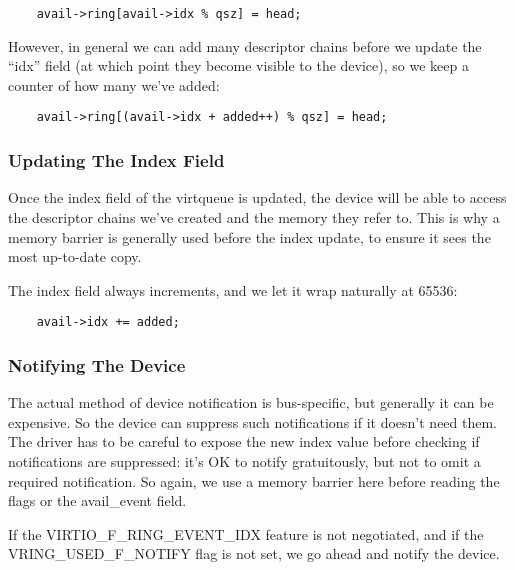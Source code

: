 \begin{lstlisting}
	avail->ring[avail->idx % qsz] = head;
\end{lstlisting}

However, in general we can add many descriptor chains before we update
the “idx” field (at which point they become visible to the
device), so we keep a counter of how many we've added:

\begin{lstlisting}
	avail->ring[(avail->idx + added++) % qsz] = head;
\end{lstlisting}

\subsubsection{Updating The Index Field}\label{sec:General Initialization And Device Operation / Device Operation / Supplying Buffers to The Device / Updating The Index Field}

Once the index field of the virtqueue is updated, the device will
be able to access the descriptor chains we've created and the
memory they refer to. This is why a memory barrier is generally
used before the index update, to ensure it sees the most up-to-date
copy.

The index field always increments, and we let it wrap naturally at
65536:

\begin{lstlisting}
	avail->idx += added;
\end{lstlisting}

\subsubsection{Notifying The Device}\label{sec:General Initialization And Device Operation / Device Operation / Supplying Buffers to The Device / Notifying The Device}

The actual method of device notification is bus-specific, but generally
it can be expensive.  So the device can suppress such notifications if it
doesn't need them.  The driver has to be careful to expose the new index
value before checking if notifications are suppressed: it's OK to notify
gratuitously, but not to omit a required notification. So again,
we use a memory barrier here before reading the flags or the
avail_event field.

If the VIRTIO_F_RING_EVENT_IDX feature is not negotiated, and if the
VRING_USED_F_NOTIFY flag is not set, we go ahead and notify the
device.

